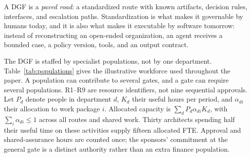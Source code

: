 A DGF is a \emph{paved road}: a standardized route with known artifacts, decision rules, interfaces,
and escalation paths. Standardization is what makes it governable by humans today, and it is also what
makes it executable by software tomorrow: instead of reconstructing an open-ended organization, an
agent receives a bounded case, a policy version, tools, and an output contract.

The DGF is staffed by specialist populations, not by one department. Table~\ref{tab:populations}
gives the illustrative workforce used throughout the paper. A population can contribute to several
gates, and a gate can require several populations. R1--R9 are resource identifiers, not nine
sequential approvals. Let $P_d$ denote people in department $d$, $K_d$ their useful hours per period,
and $\alpha_{di}$ their allocation to work package $i$. Allocated capacity is
$\sum_d P_d\alpha_{di}K_d$, with $\sum_i\alpha_{di}\le 1$ across all routes and shared work. Thirty architects spending half their useful time on these activities supply fifteen allocated FTE. Approval
and shared-assurance hours are counted once; the sponsors' commitment at the general gate is a
distinct authority rather than an extra finance population.

